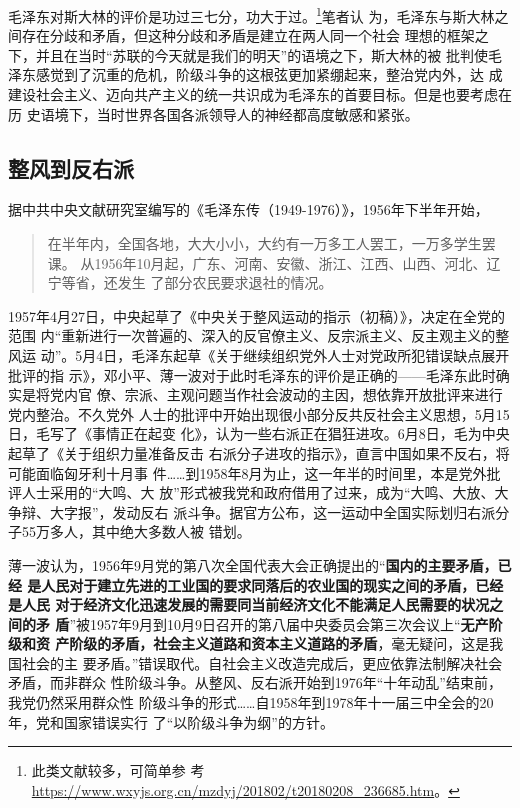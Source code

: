 毛泽东对斯大林的评价是功过三七分，功大于过。\footnote{此类文献较多，可简单参
  考\url{https://www.wxyjs.org.cn/mzdyj/201802/t20180208_236685.htm}。}笔者认
为，毛泽东与斯大林之间存在分歧和矛盾，但这种分歧和矛盾是建立在两人同一个社会
理想的框架之下，并且在当时“苏联的今天就是我们的明天”的语境之下，斯大林的被
批判使毛泽东感觉到了沉重的危机，阶级斗争的这根弦更加紧绷起来，整治党内外，达
成建设社会主义、迈向共产主义的统一共识成为毛泽东的首要目标。但是也要考虑在历
史语境下，当时世界各国各派领导人的神经都高度敏感和紧张。

\subsection{整风到反右派}

据中共中央文献研究室编写的《毛泽东传（1949-1976）》，1956年下半年开始，
\begin{quotation}
  在半年内，全国各地，大大小小，大约有一万多工人罢工，一万多学生罢课。
  从1956年10月起，广东、河南、安徽、浙江、江西、山西、河北、辽宁等省，还发生
  了部分农民要求退社的情况。
\end{quotation}

1957年4月27日，中央起草了《中央关于整风运动的指示（初稿）》，决定在全党的范围
内“重新进行一次普遍的、深入的反官僚主义、反宗派主义、反主观主义的整风运
动”。5月4日，毛泽东起草《关于继续组织党外人士对党政所犯错误缺点展开批评的指
示》，邓小平、薄一波对于此时毛泽东的评价是正确的——毛泽东此时确实是将党内官
僚、宗派、主观问题当作社会波动的主因，想依靠开放批评来进行党内整治。不久党外
人士的批评中开始出现很小部分反共反社会主义思想，5月15日，毛写了《事情正在起变
化》，认为一些右派正在猖狂进攻。6月8日，毛为中央起草了《关于组织力量准备反击
右派分子进攻的指示》，直言中国如果不反右，将可能面临匈牙利十月事
件……到1958年8月为止，这一年半的时间里，本是党外批评人士采用的“大鸣、大
放”形式被我党和政府借用了过来，成为“大鸣、大放、大争辩、大字报”，发动反右
派斗争。据官方公布，这一运动中全国实际划归右派分子55万多人，其中绝大多数人被
错划。

薄一波认为，1956年9月党的第八次全国代表大会正确提出的“\textbf{国内的主要矛盾，已经
  是人民对于建立先进的工业国的要求同落后的农业国的现实之间的矛盾，已经是人民
  对于经济文化迅速发展的需要同当前经济文化不能满足人民需要的状况之间的矛
  盾}”被1957年9月到10月9日召开的第八届中央委员会第三次会议上“\textbf{无产阶级和资
  产阶级的矛盾，社会主义道路和资本主义道路的矛盾}，毫无疑问，这是我国社会的主
要矛盾。”错误取代。自社会主义改造完成后，更应依靠法制解决社会矛盾，而非群众
性阶级斗争。从整风、反右派开始到1976年“十年动乱”结束前，我党仍然采用群众性
阶级斗争的形式……自1958年到1978年十一届三中全会的20年，党和国家错误实行
了“以阶级斗争为纲”的方针。

